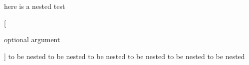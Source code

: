 here is a nested test
\begin{one}


	[

		optional argument

	]
	to be nested to be nested
	to be nested to be nested
	to be nested to be nested
\end{one}
